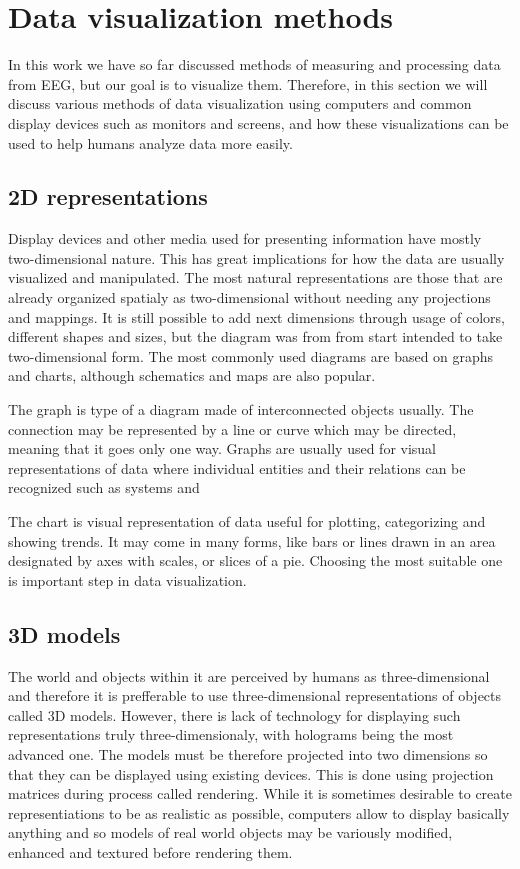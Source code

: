 \section{Data visualization methods}
In this work we have so far discussed methods of measuring and processing data
from EEG, but our goal is to visualize them. Therefore, in this section we will
discuss various methods of data visualization using computers and common display
devices such as monitors and screens, and how these visualizations can be used
to help humans analyze data more easily.

\subsection{2D representations}
Display devices and other media used for presenting information have
mostly two-dimensional nature. This has great implications for how the data are
usually visualized and manipulated. The most natural representations are those
that are already organized spatialy as two-dimensional without needing any
projections and mappings. It is still possible to add next dimensions through
usage of colors, different shapes and sizes, but the diagram was from from start
intended to take two-dimensional form. The most commonly used diagrams are based
on graphs and charts, although schematics and maps are also popular.

The graph is type of a diagram made of interconnected objects usually. The
connection may be represented by a line or curve which may be directed, meaning
that it goes only one way. Graphs are usually used for visual representations
of data where individual entities and their relations can be recognized such as
systems and %

The chart is visual representation of data useful for plotting, categorizing and
showing trends. It may come in many forms, like bars or lines drawn in an
area designated by axes with scales, or slices of a pie. Choosing the most
suitable one is important step in data visualization.

\subsection{3D models}
The world and objects within it are perceived by humans as three-dimensional and
therefore it is prefferable to use three-dimensional representations of objects
called 3D models. However, there is lack of technology for displaying such
representations truly three-dimensionaly, with holograms being the most advanced
one. The models must be therefore projected into two dimensions so that they can
be displayed using existing devices. This is done using projection matrices
during process called rendering. While it is sometimes desirable to create
representiations to be as realistic as possible, computers allow to display
basically anything and so models of real world objects may be variously
modified, enhanced and textured before rendering them. 

